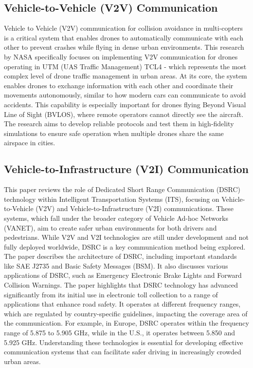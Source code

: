 \documentclass[12pt,twocolumn]{article}
\begin{document}
\subsection{Vehicle-to-Vehicle (V2V) Communication}

Vehicle to Vehicle (V2V) communication for collision avoidance in multi-copters is a critical system that enables drones to automatically communicate with each other to prevent crashes while flying in dense urban environments. This research by NASA specifically focuses on implementing V2V communication for drones operating in UTM (UAS Traffic Management) TCL4 - which represents the most complex level of drone traffic management in urban areas.
At its core, the system enables drones to exchange information with each other and coordinate their movements autonomously, similar to how modern cars can communicate to avoid accidents. This capability is especially important for drones flying Beyond Visual Line of Sight (BVLOS), where remote operators cannot directly see the aircraft. The research aims to develop reliable protocols and test them in high-fidelity simulations to ensure safe operation when multiple drones share the same airspace in cities.

\subsection{Vehicle-to-Infrastructure (V2I) Communication}

This paper reviews the role of Dedicated Short Range Communication (DSRC) technology within Intelligent Transportation Systems (ITS), focusing on Vehicle-to-Vehicle (V2V) and Vehicle-to-Infrastructure (V2I) communications. These systems, which fall under the broader category of Vehicle Ad-hoc Networks (VANET), aim to create safer urban environments for both drivers and pedestrians. While V2V and V2I technologies are still under development and not fully deployed worldwide, DSRC is a key communication method being explored. The paper describes the architecture of DSRC, including important standards like SAE J2735 and Basic Safety Messages (BSM). It also discusses various applications of DSRC, such as Emergency Electronic Brake Lights and Forward Collision Warnings.
The paper highlights that DSRC technology has advanced significantly from its initial use in electronic toll collection to a range of applications that enhance road safety. It operates at different frequency ranges, which are regulated by country-specific guidelines, impacting the coverage area of the communication. For example, in Europe, DSRC operates within the frequency range of 5.875 to 5.905 GHz, while in the U.S., it operates between 5.850 and 5.925 GHz. Understanding these technologies is essential for developing effective communication systems that can facilitate safer driving in increasingly crowded urban areas.
\end{document}
